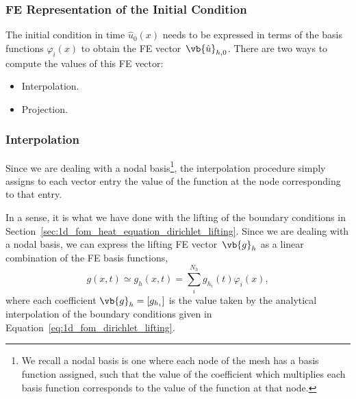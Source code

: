 \documentclass[../../main.tex]{subfiles}
\begin{document}
\subsubsection{FE Representation of the Initial Condition}
\label{sec:1d_fom_projection_interpolation}
The initial condition in time $\hat{u}_0(x)$ needs to be expressed in terms of the basis functions $\varphi_i(x)$ to obtain the FE vector~$\vb{\hat{u}}_{h,0}$.
There are two ways to compute the values of this FE vector:
\begin{itemize}
    \item Interpolation.
    \item Projection.
\end{itemize}

\subsubsection*{Interpolation}
Since we are dealing with a nodal basis\footnote{We recall a nodal basis is one where each node of the mesh has a basis function assigned, 
such that the value of the coefficient which multiplies each basis function corresponds to the value of the function at that node.}, 
the interpolation procedure simply assigns to each vector entry the value of the function at the node corresponding to that entry.

In a sense, it is what we have done with the lifting of the boundary conditions in Section~\ref{sec:1d_fom_heat_equation_dirichlet_lifting}.
Since we are dealing with a nodal basis, we can express the lifting FE vector~$\vb{g}_h$ as a linear combination of the FE basis functions,
\begin{equation}
    g(x,t) \simeq g_h(x,t) = \sum_i^{N_h} g_{h_i}(t) \varphi_i(x),
\end{equation}
where each coefficient $\vb{g}_h = [g_{h_i}]$ is the value taken by the analytical interpolation of the boundary conditions given in Equation~\eqref{eq:1d_fom_dirichlet_lifting}. 
\end{document}

